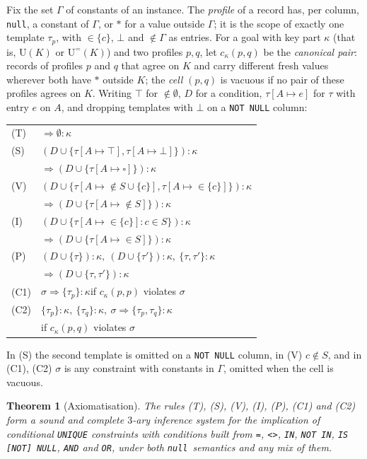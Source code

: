 \documentclass[conference]{IEEEtran}
\newtheorem{theorem}{Theorem}
\theoremstyle{definition}
\newcommand{\sql}[1]{\texttt{#1}}
\newcommand{\nul}{\texttt{null}}
\newcommand{\U}[1]{\mathrm{U}(#1)}
\newcommand{\Ueq}[1]{\mathrm{U}^{=}(#1)}
\newcommand{\any}{\square}
\begin{document}
Fix the set $\Gamma$ of constants of an instance. The
\emph{profile} of a record has, per column, \nul, a constant of $\Gamma$, or $*$ for a value
outside $\Gamma$; it is the scope of exactly one template $\tau_p$, with ${\in}\{c\}$, $\bot$ and
${\notin}\Gamma$ as entries. For a goal with key part $\kappa$ (that is, $\U{K}$ or $\Ueq{K}$) and two
profiles $p,q$, let $c_\kappa(p,q)$ be the \emph{canonical pair}: records of profiles $p$ and $q$
that agree on $K$ and carry different fresh values wherever both have $*$ outside $K$; the
\emph{cell} $(p,q)$ is vacuous if no pair of these profiles agrees on $K$. Writing $\top$ for
${\notin}\emptyset$, $D$ for a condition, $\tau[A{\mapsto}e]$ for $\tau$ with entry $e$ on $A$, and
dropping templates with $\bot$ on a \sql{NOT NULL} column:
\begin{center}\small
\begin{tabular}{@{}l@{\ }l@{}}
(T) & ${}\Rightarrow\emptyset:\kappa$\\
(S) & $(D\cup\{\tau[A{\mapsto}\top],\tau[A{\mapsto}\bot]\}):\kappa$\\
 & \quad${}\Rightarrow(D\cup\{\tau[A{\mapsto}\any]\}):\kappa$\\
(V) & $(D\cup\{\tau[A{\mapsto}{\notin}S{\cup}\{c\}],\tau[A{\mapsto}{\in}\{c\}]\}):\kappa$\\
 & \quad${}\Rightarrow(D\cup\{\tau[A{\mapsto}{\notin}S]\}):\kappa$\\
(I) & $(D\cup\{\tau[A{\mapsto}{\in}\{c\}]:c\in S\}):\kappa$\\
 & \quad${}\Rightarrow(D\cup\{\tau[A{\mapsto}{\in}S]\}):\kappa$\\
(P) & $(D\cup\{\tau\}):\kappa,\ (D\cup\{\tau'\}):\kappa,\ \{\tau,\tau'\}:\kappa$\\
 & \quad${}\Rightarrow(D\cup\{\tau,\tau'\}):\kappa$\\
(C1) & $\sigma\Rightarrow\{\tau_p\}:\kappa$\quad if $c_\kappa(p,p)$ violates $\sigma$\\
(C2) & $\{\tau_p\}:\kappa,\ \{\tau_q\}:\kappa,\ \sigma\Rightarrow\{\tau_p,\tau_q\}:\kappa$\\
 & \quad if $c_\kappa(p,q)$ violates $\sigma$
\end{tabular}
\end{center}
In (S) the second template is omitted on a \sql{NOT NULL} column, in (V) $c\notin S$, and in
(C1), (C2) $\sigma$ is any constraint with constants in $\Gamma$, omitted when the cell is vacuous.

\begin{theorem}[Axiomatisation]\label{thm:axiom}
The rules (T), (S), (V), (I), (P), (C1) and (C2) form a sound and complete $3$-ary inference
system for the implication of conditional \sql{UNIQUE} constraints with conditions built from
\sql{=}, \sql{<>}, \sql{IN}, \sql{NOT IN}, \sql{IS [NOT] NULL}, \sql{AND} and \sql{OR}, under both
\nul\ semantics and any mix of them.
\end{theorem}
\end{document}
